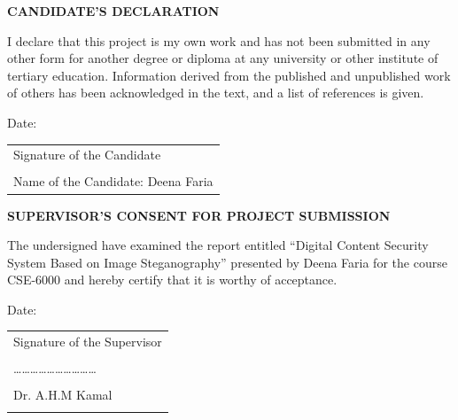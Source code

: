 \documentclass{report}
\begin{document}
\newpage
\begin{center}
    \textbf{\large CANDIDATE’S DECLARATION}
\end{center}
\vspace{1cm}
I declare that this project is my own work and has not been submitted in any other form for another degree or diploma at any university or other institute of tertiary education. Information derived from the published and unpublished work of others has been acknowledged in the text, and a list of references is given.

\vspace{2cm} %

\noindent
\begin{minipage}[t]{0.6\textwidth}
    Date:
\end{minipage}%
\hfill
\begin{minipage}[t]{0.4\textwidth}
    \raggedleft
    \begin{tabular}[t]{@{} l @{}}
        \quad \quad Signature of the Candidate \\\\
        \quad Name of the Candidate: Deena Faria \\
    \end{tabular}
\end{minipage}
\thispagestyle{empty}
 
\newpage
\begin{center}
    \textbf{\large SUPERVISOR’S CONSENT FOR PROJECT SUBMISSION}
\end{center}

The undersigned have examined the report entitled “Digital Content Security System Based on Image Steganography” presented by Deena Faria for the course CSE-6000 and hereby certify that it is worthy of acceptance.

\vspace{1cm} %

\noindent
\begin{minipage}[t]{0.6\textwidth}
    Date:
\end{minipage}%
\hfill
\begin{minipage}[t]{0.4\textwidth}
    \raggedleft
    \begin{tabular}[t]{@{} l @{}}
        Signature of the Supervisor \\\\
        ………………………… \\\\
        \qquad Dr. A.H.M Kamal \\\\
    \end{tabular}
\end{minipage}
\thispagestyle{empty}
\end{document}
